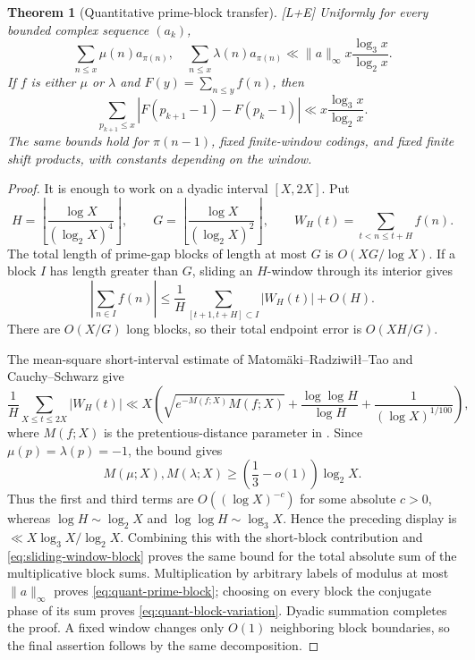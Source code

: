 \documentclass[11pt]{article}
\newtheorem{theorem}{Theorem}[section]
\theoremstyle{definition}
\theoremstyle{remark}
\newcommand{\status}[1]{\textnormal{\textcolor{accent}{\footnotesize[#1]}}}
\begin{document}
\begin{theorem}[Quantitative prime-block transfer]
\label{thm:quant-prime-block}
\status{L+E}
Uniformly for every bounded complex sequence $(a_k)$,
\begin{equation}\label{eq:quant-prime-block}
 \sum_{n\le x}\mu(n)a_{\pi(n)},\quad
 \sum_{n\le x}\lambda(n)a_{\pi(n)}
 \ll \|a\|_\infty x\frac{\log_3x}{\log_2x}.
\end{equation}
If $f$ is either $\mu$ or $\lambda$ and $F(y)=\sum_{n\le y}f(n)$, then
\begin{equation}\label{eq:quant-block-variation}
 \sum_{p_{k+1}\le x}
 \left|F(p_{k+1}-1)-F(p_k-1)\right|
 \ll x\frac{\log_3x}{\log_2x}.
\end{equation}
The same bounds hold for $\pi(n-1)$, fixed finite-window codings, and fixed finite
shift products, with constants depending on the window.
\end{theorem}

\begin{proof}
It is enough to work on a dyadic interval $[X,2X]$.  Put
\[
 H=\left\lfloor\frac{\log X}{(\log_2X)^4}\right\rfloor,
 \qquad
 G=\left\lfloor\frac{\log X}{(\log_2X)^2}\right\rfloor,
 \qquad
 W_H(t)=\sum_{t<n\le t+H}f(n).
\]
The total length of prime-gap blocks of length at most $G$ is
$O(XG/\log X)$.  If a block $I$ has length greater than $G$, sliding an
$H$-window through its interior gives
\begin{equation}\label{eq:sliding-window-block}
 \left|\sum_{n\in I}f(n)\right|
 \le \frac1H
 \sum_{[t+1,t+H]\subset I}|W_H(t)|+O(H).
\end{equation}
There are $O(X/G)$ long blocks, so their total endpoint error is $O(XH/G)$.

The mean-square short-interval estimate of Matom\"aki--Radziwi\l\l--Tao and
Cauchy--Schwarz give
\[
 \frac1H\sum_{X\le t\le2X}|W_H(t)|
 \ll X\left(
 \sqrt{e^{-M(f;X)}M(f;X)}
 +\frac{\log\log H}{\log H}
 +\frac1{(\log X)^{1/100}}
 \right),
\]
where $M(f;X)$ is the pretentious-distance parameter in
\cite[Appendix~A, Theorem~A.1]{MRTChowla}.  Since
$\mu(p)=\lambda(p)=-1$, the bound
\cite[(1.12)]{MRTChowla} gives
\[
 M(\mu;X),M(\lambda;X)\ge\left(\frac13-o(1)\right)\log_2X.
\]
Thus the first and third terms are $O((\log X)^{-c})$ for some absolute $c>0$,
whereas $\log H\sim\log_2X$ and $\log\log H\sim\log_3X$.  Hence the preceding
display is $\ll X\log_3X/\log_2X$.  Combining this with the short-block contribution and
\eqref{eq:sliding-window-block} proves the same bound for the total absolute sum of
the multiplicative block sums.  Multiplication by arbitrary labels of modulus at most
$\|a\|_\infty$ proves \eqref{eq:quant-prime-block}; choosing on every block the
conjugate phase of its sum proves \eqref{eq:quant-block-variation}.  Dyadic summation
completes the proof.  A fixed window changes only $O(1)$ neighboring block boundaries,
so the final assertion follows by the same decomposition.
\end{proof}
\end{document}
